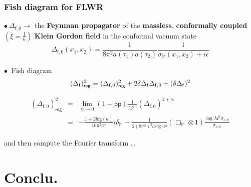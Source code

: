 \documentclass[9pt]{beamer}
\newcommand{\logar}{\mathsf{log}} %
\newcommand{\pp}{\mathsf{pp}} %
\newcommand{\Mbb}{\mathbb{M}}
\newcommand{\fsf}{\mathsf{f}}
\begin{document}
\begin{frame}%

\frametitle{Fish diagram for FLWR} 

$\bullet \ \Delta_{\fsf,0} \to$ the \textbf{Feynman propagator} of the \textbf{massless}, \textbf{conformally coupled} $(\xi = \frac16)$ \textbf{Klein Gordon field} in the conformal vacuum state 
\begin{equation*}
\Delta_{\fsf,0}(x_1,x_2)=\frac{1}{8\pi^2 a(\tau_1)a(\tau_2)}\frac{1}{\sigma_{\Mbb}(x_1,x_2)+i\epsilon} 
\end{equation*}

$\bullet \ $ Fish diagram
\vspace*{-12pt}
\begin{equation*}
 (\Delta_\fsf)^2_\mathsf{reg} = (\Delta_{\fsf,0})^2_\mathsf{reg} + 2 \delta\Delta_\fsf \Delta_{\fsf,0} + (\delta\Delta_\fsf)^2
\vspace*{-25pt}
\end{equation*}

\begin{eqnarray*}
(\Delta_{\fsf,0})^2_\mathsf{reg} &=& 
\lim_{\alpha\to 0} \left( 1 - \pp \right) \frac{1}{M^{2\alpha}} (\Delta_{\fsf,0})^{2+\alpha} \\
&=& - \frac{1+2\logar(a)}{16\pi^2 a^4} i\delta_\Mbb-\frac{1}{2(8\pi^2)^2 a^2\otimes a^2} \left(\Box_{\Mbb}\otimes 1\right)\frac{\log{M^2\sigma_{\epsilon,\Mbb}}}{\sigma_{\epsilon,\Mbb}}
\end{eqnarray*}

and then compute the Fourier transform \dots


\end{frame}

\section{Conclu.}
\end{document}
